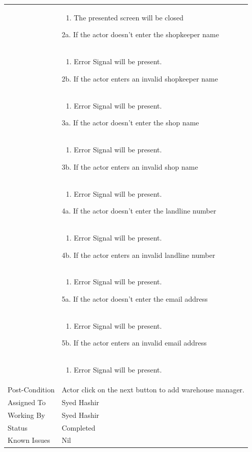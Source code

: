 \documentclass[12pt,a4paper]{article}
\begin{document}
\begin{longtable}{| p{3cm}|p{12cm}|}
&	\begin{enumerate}
		\item The presented screen will be closed
	\end{enumerate}
2a. If the actor doesn't enter the shopkeeper name \\ 	
&	\begin{enumerate}
		\item Error Signal will be present.
	\end{enumerate}
2b. If the actor enters an invalid shopkeeper name \\ 	
&	\begin{enumerate}
		\item Error Signal will be present.
	\end{enumerate}
3a. If the actor doesn't enter the shop name \\ 	
&	\begin{enumerate}
		\item Error Signal will be present.
	\end{enumerate}
3b. If the actor enters an invalid shop name \\ 	
&	\begin{enumerate}
		\item Error Signal will be present.
	\end{enumerate}
4a. If the actor doesn't enter the landline number \\ 	
&	\begin{enumerate}
		\item Error Signal will be present.
	\end{enumerate}
4b. If the actor enters an invalid landline number\\ 	
&	\begin{enumerate}
		\item Error Signal will be present.
	\end{enumerate}
5a. If the actor doesn't enter the email address \\ 	
&	\begin{enumerate}
		\item Error Signal will be present.
	\end{enumerate}
5b. If the actor enters an invalid email address\\ 	
&	\begin{enumerate}
		\item Error Signal will be present.
	\end{enumerate}
\\ \hline
Post-Condition & Actor click on the next button to add warehouse manager.  \\\hline
Assigned To &  Syed Hashir
\\ \hline
Working By &   Syed Hashir
\\ \hline
Status & 	Completed	
\\ \hline
Known Issues & Nil
\\\hline
\end{longtable}
\end{document}
